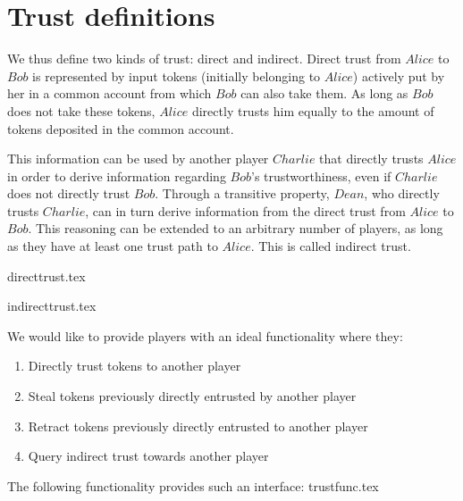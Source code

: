 \section{Trust definitions}
  We thus define two kinds of trust: direct and indirect. Direct trust from $Alice$ to $Bob$ is represented by input tokens
  (initially belonging to $Alice$) actively put by her in a common account from which $Bob$ can also take them. As long as
  $Bob$ does not take these tokens, $Alice$ directly trusts him equally to the amount of tokens deposited in the common
  account.
  
  This information can be used by another player $Charlie$ that directly trusts $Alice$ in order to derive information
  regarding $Bob$'s trustworthiness, even if $Charlie$ does not directly trust $Bob$. Through a transitive property, $Dean$,
  who directly trusts $Charlie$, can in turn derive information from the direct trust from $Alice$ to $Bob$. This reasoning can
  be extended to an arbitrary number of players, as long as they have at least one trust path to $Alice$. This is called
  indirect trust.

  {directtrust.tex}

  {indirecttrust.tex}

  We would like to provide players with an ideal functionality where they:
  \begin{enumerate}
    \item Directly trust tokens to another player
    \item Steal tokens previously directly entrusted by another player
    \item Retract tokens previously directly entrusted to another player
    \item Query indirect trust towards another player
  \end{enumerate}
  The following functionality provides such an interface:
  {trustfunc.tex}

